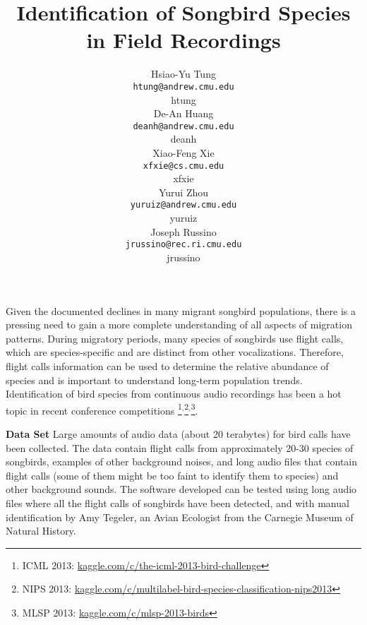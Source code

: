 \documentclass{article} %
\title{Identification of Songbird Species in Field Recordings
}
\author{
Hsiao-Yu Tung \\
\texttt{htung@andrew.cmu.edu} \\
htung \\
\And
De-An Huang \\
\texttt{deanh@andrew.cmu.edu} \\
deanh \\
\And
Xiao-Feng Xie \\
\texttt{xfxie@cs.cmu.edu} \\
xfxie \\
\And
Yurui Zhou\\
\texttt{yuruiz@andrew.cmu.edu}\\
yuruiz \\
\And
Joseph Russino\\
\texttt{jrussino@rec.ri.cmu.edu}\\
jrussino \\
}
\begin{document}
\maketitle


Given the documented declines in many migrant songbird populations, there is a pressing need to gain a more complete understanding of all aspects of migration patterns.
During migratory periods, many species of songbirds use flight calls, which are species-specific and are distinct from other vocalizations. Therefore, flight calls information can be used to determine the relative abundance of species and is important to understand long-term population trends. Identification of bird species from continuous audio recordings has been a hot topic in recent conference competitions
\footnote{ICML 2013: \url{kaggle.com/c/the-icml-2013-bird-challenge}}$^,$\footnote{NIPS 2013: \url{kaggle.com/c/multilabel-bird-species-classification-nips2013}}$^,$\footnote{MLSP 2013: \url{kaggle.com/c/mlsp-2013-birds}}.

{\bf Data Set} Large amounts of audio data (about 20 terabytes) for bird calls have been collected. The data contain flight calls from approximately 20-30 species of songbirds, examples of other background noises, and long audio files that contain flight calls (some of them might be too faint to identify them to species) and other background sounds. The software developed can be tested using long audio files where all the flight calls of songbirds have been detected, and with manual identification by Amy Tegeler, an Avian Ecologist from the Carnegie Museum of Natural History.

\end{document}
